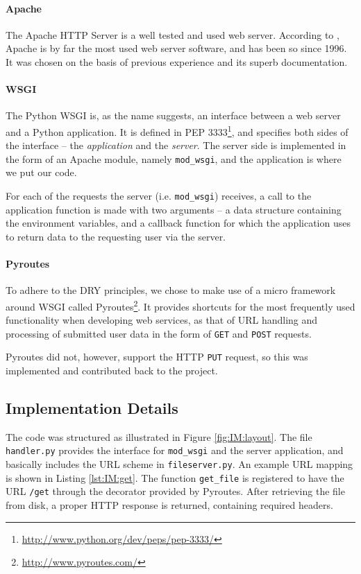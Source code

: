 \documentclass[pdftex,english,10pt,b5paper,twoside]{book}
\begin{document}
\paragraph{Apache} The Apache HTTP Server is a well tested and used web
server. According to \citet{netcraft}, Apache is by far the most used web server
software, and has been so since 1996. It was chosen on the basis of previous
experience and its superb documentation.

\paragraph{\acs{WSGI}} The Python \ac{WSGI} is, as the name suggests, an
interface between a web server and a Python application. It is defined in
\ac{PEP} 3333\footnote{\url{http://www.python.org/dev/peps/pep-3333/}}, and
specifies both sides of the interface -- the \emph{application} and the
\emph{server}. The server side is implemented in the form of an Apache 
module, namely \texttt{mod\_wsgi}, and the application is where we put our
code.

For each of the requests the server (i.e. \texttt{mod\_wsgi}) receives, a call
to the application function is made with two arguments -- a data structure
containing the environment variables, and a callback function for which the
application uses to return data to the requesting user via the server.

\paragraph{Pyroutes} To adhere to the \ac{DRY} principles, we chose to make use
of a micro framework around \ac{WSGI} called
Pyroutes\footnote{\url{http://www.pyroutes.com/}}. It provides shortcuts for the
most frequently used functionality when developing web services, as that of
\ac{URL} handling and processing of submitted user data in the form of
\texttt{GET} and \texttt{POST} requests.

Pyroutes did not, however, support the HTTP \texttt{PUT} request, so this was
implemented and contributed back to the project.

\subsection{Implementation Details}

The code was structured as illustrated in Figure \ref{fig:IM:layout}. The file
\texttt{handler.py} provides the interface for \texttt{mod\_wsgi} and the server
application, and basically includes the \ac{URL} scheme in
\texttt{fileserver.py}. An example \ac{URL} mapping is shown in Listing
\ref{lst:IM:get}. The function \texttt{get\_file} is registered to have the
\ac{URL} \texttt{/get} through the decorator provided by Pyroutes. After
retrieving the file from disk, a proper \ac{HTTP} response is returned,
containing required headers.
\end{document}
